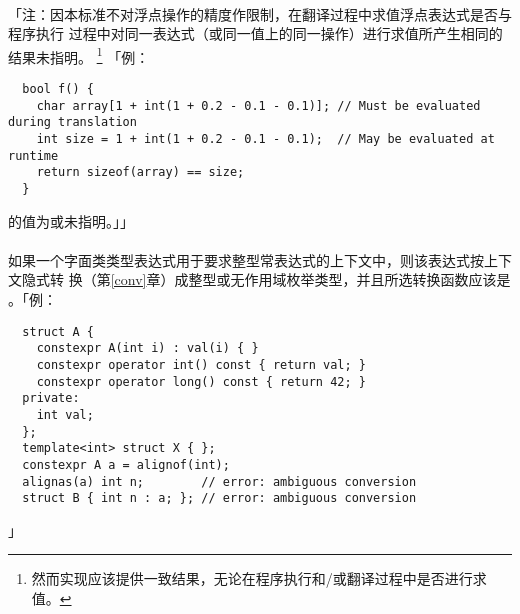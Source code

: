 \paragraph{}
「注：因本标准不对浮点操作的精度作限制，在翻译过程中求值浮点表达式是否与程序执行
过程中对同一表达式（或同一值上的同一操作）进行求值所产生相同的结果未指明。
\footnote{然而实现应该提供一致结果，无论在程序执行和/或翻译过程中是否进行求值。}
「例：
\begin{lstlisting}
  bool f() {
    char array[1 + int(1 + 0.2 - 0.1 - 0.1)]; // Must be evaluated during translation
    int size = 1 + int(1 + 0.2 - 0.1 - 0.1);  // May be evaluated at runtime 
    return sizeof(array) == size;
  }
\end{lstlisting}
的值为或未指明。」」

\paragraph{}
如果一个字面类类型表达式用于要求整型常表达式的上下文中，则该表达式按上下文隐式转
换（第\ref{conv}章）成整型或无作用域枚举类型，并且所选转换函数应该是
。「例：
\begin{lstlisting}
  struct A {
    constexpr A(int i) : val(i) { }
    constexpr operator int() const { return val; }
    constexpr operator long() const { return 42; }
  private:
    int val;
  };
  template<int> struct X { };
  constexpr A a = alignof(int);
  alignas(a) int n;        // error: ambiguous conversion
  struct B { int n : a; }; // error: ambiguous conversion
\end{lstlisting}」
